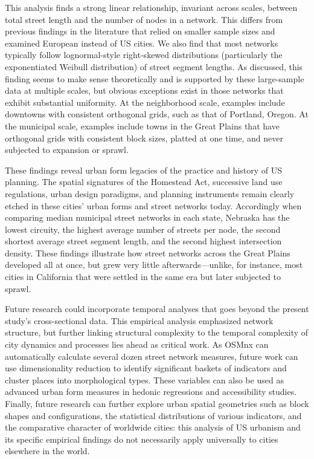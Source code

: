 \documentclass[11pt]{article}
\begin{document}
\begin{multicols}{2}
This analysis finds a strong linear relationship, invariant across scales, between total street length and the number of nodes in a network. This differs from previous findings in the literature that relied on smaller sample sizes and examined European instead of US cities. We also find that most networks typically follow lognormal-style right-skewed distributions (particularly the exponentiated Weibull distribution) of street segment lengths. As discussed, this finding seems to make sense theoretically and is supported by these large-sample data at multiple scales, but obvious exceptions exist in those networks that exhibit substantial uniformity. At the neighborhood scale, examples include downtowns with consistent orthogonal grids, such as that of Portland, Oregon. At the municipal scale, examples include towns in the Great Plains that have orthogonal grids with consistent block sizes, platted at one time, and never subjected to expansion or sprawl.

These findings reveal urban form legacies of the practice and history of US planning. The spatial signatures of the Homestead Act, successive land use regulations, urban design paradigms, and planning instruments remain clearly etched in these cities' urban forms and street networks today. Accordingly when comparing median municipal street networks in each state, Nebraska has the lowest circuity, the highest average number of streets per node, the second shortest average street segment length, and the second highest intersection density. These findings illustrate how street networks across the Great Plains developed all at once, but grew very little afterwards---unlike, for instance, most cities in California that were settled in the same era but later subjected to sprawl.

Future research could incorporate temporal analyses that goes beyond the present study's cross-sectional data. This empirical analysis emphasized network structure, but further linking structural complexity to the temporal complexity of city dynamics and processes lies ahead as critical work. As OSMnx can automatically calculate several dozen street network measures, future work can use dimensionality reduction to identify significant baskets of indicators and cluster places into morphological types. These variables can also be used as advanced urban form measures in hedonic regressions and accessibility studies. Finally, future research can further explore urban spatial geometries such as block shapes and configurations, the statistical distributions of various indicators, and the comparative character of worldwide cities: this analysis of US urbanism and its specific empirical findings do not necessarily apply universally to cities elsewhere in the world.


\end{multicols}
\end{document}
